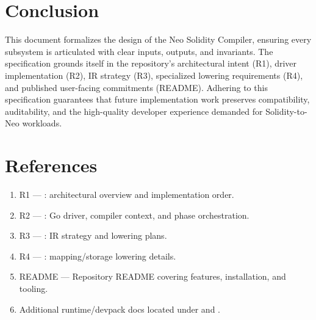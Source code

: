 \documentclass[11pt]{article}
\begin{document}
\section{Conclusion}
This document formalizes the design of the Neo Solidity Compiler, ensuring every subsystem is articulated with clear inputs, outputs, and invariants. The specification grounds itself in the repository's architectural intent (R1), driver implementation (R2), IR strategy (R3), specialized lowering requirements (R4), and published user-facing commitments (README). Adhering to this specification guarantees that future implementation work preserves compatibility, auditability, and the high-quality developer experience demanded for Solidity-to-Neo workloads.

\section*{References}
\begin{enumerate}
    \item R1 — : architectural overview and implementation order.
    \item R2 — : Go driver, compiler context, and phase orchestration.
    \item R3 — : IR strategy and lowering plans.
    \item R4 — : mapping/storage lowering details.
    \item README — Repository README covering features, installation, and tooling.
    \item Additional runtime/devpack docs located under  and .
\end{enumerate}
\end{document}
